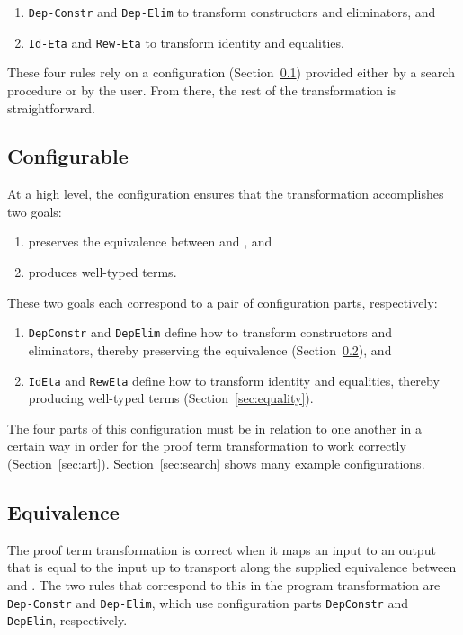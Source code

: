 \begin{enumerate}
\item \lstinline{Dep-Constr} and \lstinline{Dep-Elim} to transform constructors and eliminators, and
\item \lstinline{Id-Eta} and \lstinline{Rew-Eta} to transform identity and equalities.
\end{enumerate}
These four rules rely on a configuration (Section~\ref{sec:configurable}) %
provided either by a search procedure or by the user.
From there, the rest of the transformation is straightforward.

\subsection{Configurable}
\label{sec:configurable}

At a high level, the configuration ensures that the transformation accomplishes two goals:

\begin{enumerate}
\item preserves the equivalence between \A and \B, and
\item produces well-typed terms.
\end{enumerate}
These two goals each correspond to a pair of configuration parts, respectively:

\begin{enumerate}
\item \lstinline{DepConstr} and \lstinline{DepElim} define how to transform constructors and eliminators, thereby preserving the equivalence (Section~\ref{sec:equivalence}), and 
\item \lstinline{IdEta} and \lstinline{RewEta} define how to transform identity and equalities, thereby producing well-typed terms (Section~\ref{sec:equality}).
\end{enumerate}

The four parts of this configuration must be in relation to one another in a certain way in order for the proof
term transformation to work correctly (Section~\ref{sec:art}).
Section~\ref{sec:search} shows many example configurations.

\subsection{Equivalence}
\label{sec:equivalence}

The proof term transformation is correct when it maps an input to an output that is equal
to the input up to transport along the supplied equivalence between \A and \B.
The two rules that correspond to this in the program transformation are \lstinline{Dep-Constr} and \lstinline{Dep-Elim},
which use configuration parts \lstinline{DepConstr} and \lstinline{DepElim}, respectively.

